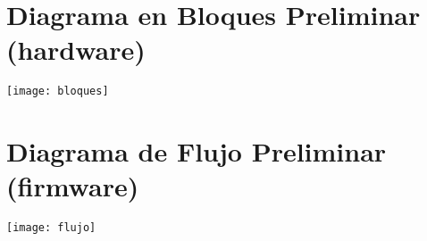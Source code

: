 \section{Diagrama en Bloques Preliminar (hardware)}
\begin{center}
    \texttt{[image: bloques]}
\end{center}



\section{Diagrama de Flujo Preliminar (firmware)}
\begin{center}
    \vspace{-4mm}
    \texttt{[image: flujo]}
\end{center}



